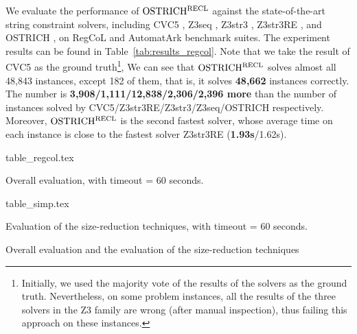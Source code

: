 We evaluate the performance of $\rm OSTRICH^{RECL}$ against the state-of-the-art string constraint solvers, including CVC5
\cite{cvc5}, Z3seq \cite{z3seq}, Z3str3
\cite{z3str3}, Z3str3RE \cite{z3str3re}, and OSTRICH
\cite{ostrich2023}, on RegCoL and AutomatArk benchmark suites.
The experiment results can be found in Table~\ref{tab:results_regcol}. Note that we take the result of CVC5 as the ground truth\footnote{Initially,  we used the majority vote of the results of the solvers as the ground truth. Nevertheless, on some problem instances, all the results of the three solvers in the Z3 family are wrong (after manual inspection), thus failing this approach on these instances.},  We can see that $\rm OSTRICH^{RECL}$ solves almost all 48,843 instances, except 182 of them, that is, it solves \textbf{48,662} instances correctly. The number is \textbf{3,908/1,111/12,838/2,306/2,396 more} than the number of instances solved by CVC5/Z3str3RE/Z3str3/Z3seq/OSTRICH respectively.
%
Moreover, $\rm OSTRICH^{RECL}$ is the second fastest solver, whose average time on each instance is close to the fastest solver Z3str3RE (\textbf{1.93s}/1.62s). 

%
\begin{table}
  \centering
  \begin{subtable}{0.513\textwidth}
      \centering
      {table_regcol.tex}
      \caption{Overall evaluation, with timeout = 60 seconds.}
      \label{tab:results_regcol}
  \end{subtable}
  \begin{subtable}{0.477\textwidth}
      \centering
      {table_simp.tex}
      \caption{Evaluation of the size-reduction techniques, with timeout = 60 seconds.}
      \label{tab:results_simp}
  \end{subtable}
  \caption{Overall evaluation and the evaluation of the size-reduction techniques}
\end{table}

